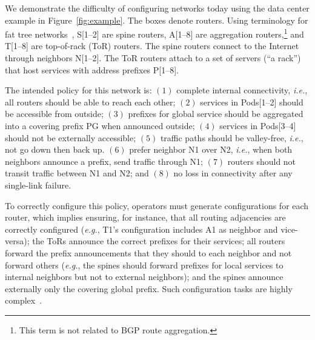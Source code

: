 \documentclass[numbers, 10pt, preprint]{sigplanconf}
\newcommand{\todo}[1]{\textcolor{red}{[TODO: #1]}}
\newcommand{\EG}{\emph{e.g.}}
\newcommand{\IE}{\emph{i.e.}}
\begin{document}
We demonstrate the difficulty of configuring networks today using the data center example in Figure~\ref{fig:example}. The boxes denote routers. Using terminology for fat tree networks~\cite{fattree}, S[1--2] are spine routers, A[1--8] are aggregation routers,\footnote{This term is not related to BGP route aggregation.} and T[1--8] are top-of-rack (ToR) routers. The spine routers connect to the Internet through neighbors N[1--2].
The ToR routers attach to a set of servers (``a rack'') that host services with address prefixes P[1--8].



The intended policy for this network is:
$(1)$ complete internal connectivity, \IE, all routers should be able to reach each other;
$(2)$ services in Pods[1--2] should be accessible from outside;
$(3)$ prefixes for global service should be aggregated into a covering prefix PG when announced outside;
$(4)$ services in Pods[3--4] should not be externally accessible;
$(5)$ traffic paths should be valley-free, \IE, not go down then back up.
$(6)$ prefer neighbor N1 over N2, \IE, when both neighbors announce a prefix, send traffic through N1;
$(7)$ routers should not transit traffic between N1 and N2; and
$(8)$ no loss in connectivity after any single-link failure.

To correctly configure this policy, operators must generate configurations for each router, which implies ensuring, for instance, that all routing adjacencies are correctly configured (\EG, T1's configuration includes A1 as neighbor and vice-versa); the ToRs announce the correct prefixes for their services; all routers  forward the prefix announcements that they should to each neighbor and not forward others (\EG, the spines should forward prefixes for local services to internal neighbors but not to external neighbors); and the spines announce externally only the covering global prefix. Such configuration tasks are highly complex~\cite{juniper-study,bgpmon,batfish,propane}.
\end{document}
